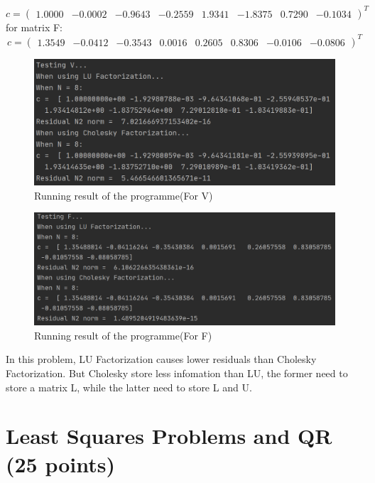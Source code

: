 \documentclass[10pt]{article}
\begin{document}
\begin{enumerate}[label=3.\arabic*]
\begin{equation}
	c=\left(                 
	\begin{array}{cccccccc}
	1.0000&-0.0002&-0.9643&-0.2559&1.9341&-1.8375&0.7290&-0.1034
	\end{array}
	\right)^T              
	\end{equation}
	for matrix F:
	\begin{equation}      
	c=\left(                 
	\begin{array}{cccccccc}
	1.3549&-0.0412&-0.3543&0.0016&0.2605&0.8306&-0.0106&-0.0806
	\end{array}
	\right)^T              
	\end{equation}
	\begin{figure}[H]
		\centering
		\includegraphics[width=1\textwidth]{./linear algebra/result_3.png}
		\caption{Running result of the programme(For V)}
	\end{figure}
	\begin{figure}[H]
		\centering
		\includegraphics[width=1\textwidth]{./linear algebra/result_4.png}
		\caption{Running result of the programme(For F)}
	\end{figure}
	In this problem, LU Factorization causes lower residuals than Cholesky Factorization. But Cholesky store less infomation than LU, the former need to store a matrix L, while the latter need to store L and U.\par
\end{enumerate}
	

\section{Least Squares Problems and QR (25 points)}\label{sec:lin_lsp}
\end{document}
